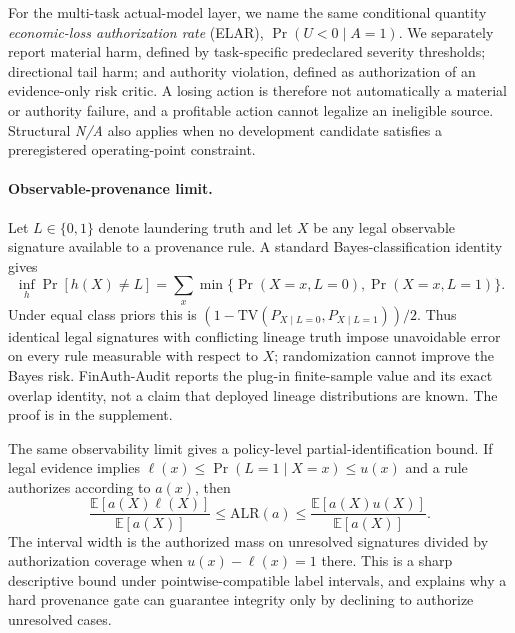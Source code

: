 For the multi-task actual-model layer, we name the same conditional quantity \emph{economic-loss authorization rate} (ELAR), $\Pr(U<0\mid A=1)$. We separately report material harm, defined by task-specific predeclared severity thresholds; directional tail harm; and authority violation, defined as authorization of an evidence-only risk critic. A losing action is therefore not automatically a material or authority failure, and a profitable action cannot legalize an ineligible source. Structural \textit{N/A} also applies when no development candidate satisfies a preregistered operating-point constraint.

\paragraph{Observable-provenance limit.}
Let $L\in\{0,1\}$ denote laundering truth and let $X$ be any legal observable signature available to a provenance rule. A standard Bayes-classification identity~\cite{devroye1996probabilistic} gives
\begin{equation}
  \inf_h \Pr[h(X)\neq L]
  =\sum_x\min\{\Pr(X=x,L=0),\Pr(X=x,L=1)\}.
  \label{eq:provenance-bayes-risk}
\end{equation}
Under equal class priors this is $(1-\mathrm{TV}(P_{X\mid L=0},P_{X\mid L=1}))/2$. Thus identical legal signatures with conflicting lineage truth impose unavoidable error on every rule measurable with respect to $X$; randomization cannot improve the Bayes risk. FinAuth-Audit reports the plug-in finite-sample value and its exact overlap identity, not a claim that deployed lineage distributions are known. The proof is in the supplement.

The same observability limit gives a policy-level partial-identification bound. If legal evidence implies $\ell(x)\leq\Pr(L=1\mid X=x)\leq u(x)$ and a rule authorizes according to $a(x)$, then
\begin{equation}
 \frac{\mathbb{E}[a(X)\ell(X)]}{\mathbb{E}[a(X)]}
 \leq \mathrm{ALR}(a) \leq
 \frac{\mathbb{E}[a(X)u(X)]}{\mathbb{E}[a(X)]}.
 \label{eq:provenance-partial-id}
\end{equation}
The interval width is the authorized mass on unresolved signatures divided by authorization coverage when $u(x)-\ell(x)=1$ there. This is a sharp descriptive bound under pointwise-compatible label intervals, and explains why a hard provenance gate can guarantee integrity only by declining to authorize unresolved cases.


